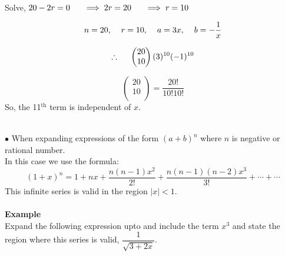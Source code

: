 \documentclass[11pt,a4paper]{article}
\begin{document}
Solve, $20-2r=0\hspace{0.5cm} \implies 2r=20\hspace{0.5cm} \implies r=10$

$$n=20,\hspace{0.4cm} r=10,\hspace{0.4cm} a=3x,\hspace{0.4cm} b=-\frac{1}{x}$$

$$\therefore \hspace{0.5cm}
\begin{pmatrix}
20\\10\\
\end{pmatrix}
(3)^{10}(-1)^{10}
$$

$$
\begin{pmatrix}
20\\10\\
\end{pmatrix}
=\frac{20!}{10!10!}
$$
So, the 11$^{\text{th}}$ term is independent of $x$.\\\\

\vspace{0.5cm}






$\bullet$ When expanding expressions of the form $(a+b)^n$ where $n$ is negative or rational number.\\

In this case we use the formula:
$$(1+x)^n=1 + nx +\frac{n(n-1)x^2}{2!}+\frac{n(n-1)(n-2)x^3}{3!}+\cdots +\cdots$$
This infinite series is valid in the region $|x|<1$.\\\\

\textbf{Example}\\
Expand the following expression upto and include the term $x^3$ and state the region where this series is valid, $\dfrac{1}{\sqrt{3+2x}}$.\\
\end{document}
